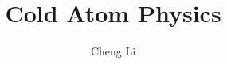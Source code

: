 \documentclass[letterpaper,11pt]{book}
\begin{document}
\title{Cold Atom Physics}
\author{Cheng Li}
\date{}
\maketitle




\end{document}
